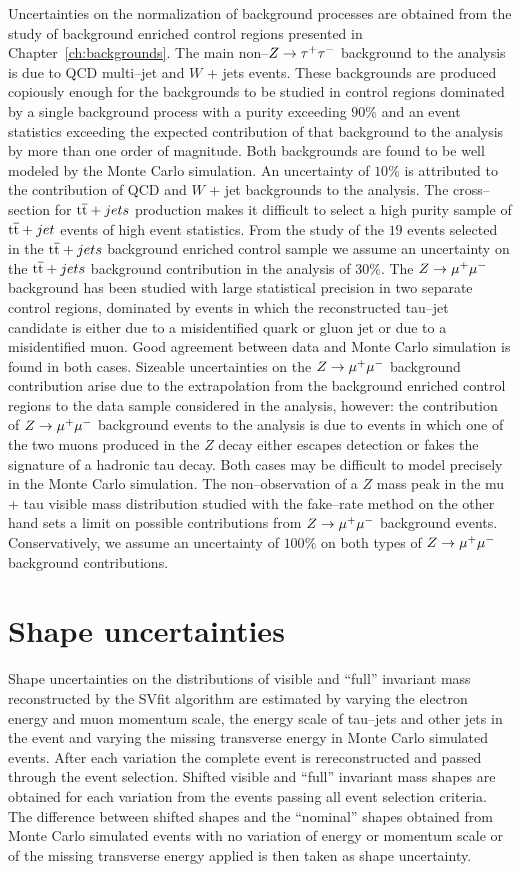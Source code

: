 Uncertainties on the normalization of background processes are obtained from the
study of background enriched control regions presented in
Chapter~\ref{ch:backgrounds}.  The main non--$Z \to \tau^+\tau^-$ background to
the analysis is due to QCD multi--jet and $W$ + jets events.  These backgrounds
are produced copiously enough for the backgrounds to be studied in control
regions dominated by a single background process with a purity exceeding $90\%$
and an event statistics exceeding the expected contribution of that background
to the analysis by more than one order of magnitude.  Both backgrounds are found
to be well modeled by the Monte Carlo simulation.  An uncertainty of $10\%$ is
attributed to the contribution of QCD and $W$ + jet backgrounds to the analysis.
The cross--section for $\mathrm{t}\overline{\mathrm{t}} + jets$ production makes it difficult to select a
high purity sample of $\mathrm{t}\overline{\mathrm{t}} + jet$ events of high event statistics.  From the
study of the $19$ events selected in the $\mathrm{t}\overline{\mathrm{t}} + jets$ background enriched
control sample we assume an uncertainty on the $\mathrm{t}\overline{\mathrm{t}} + jets$ background
contribution in the analysis of $30\%$.  The $Z \to \mu^+\mu^-$ background has been
studied with large statistical precision in two separate control regions,
dominated by events in which the reconstructed tau--jet candidate is either due
to a misidentified quark or gluon jet or due to a misidentified muon.  Good
agreement between data and Monte Carlo simulation is found in both cases.
Sizeable uncertainties on the $Z \to \mu^+\mu^-$ background contribution arise due to
the extrapolation from the background enriched control regions to the data
sample considered in the analysis, however: the contribution of $Z \to \mu^+\mu^-$
background events to the analysis is due to events in which one of the two muons
produced in the $Z$ decay either escapes detection or fakes the signature of a
hadronic tau decay.  Both cases may be difficult to model precisely in the Monte
Carlo simulation.  The non--observation of a $Z$ mass peak in the mu + tau
visible mass distribution studied with the fake--rate method on the other hand
sets a limit on possible contributions from $Z \to \mu^+\mu^-$ background events.
Conservatively, we assume an uncertainty of $100\%$ on both types of $Z \to \mu^+\mu^-$
background contributions.


\section{Shape uncertainties}

Shape uncertainties on the distributions of visible and ``full'' invariant mass
reconstructed by the SVfit algorithm are estimated by varying the electron
energy and muon momentum scale, the energy scale of tau--jets and other jets in
the event and varying the missing transverse energy in Monte Carlo simulated
events.  After each variation the complete event is rereconstructed and passed
through the event selection.  Shifted visible and ``full'' invariant mass shapes
are obtained for each variation from the events passing all event selection
criteria.  The difference between shifted shapes and the ``nominal'' shapes
obtained from Monte Carlo simulated events with no variation of energy or
momentum scale or of the missing transverse energy applied is then taken as
shape uncertainty.

